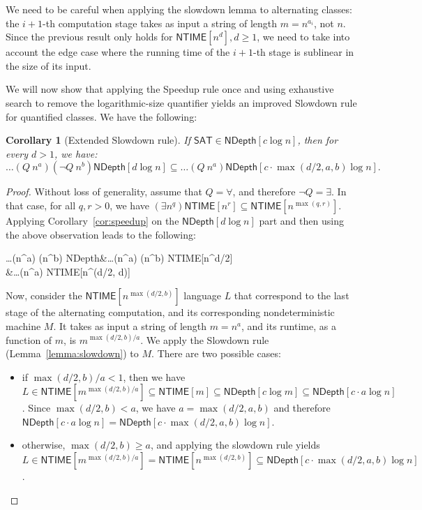 \documentclass[a4paper, 11pt]{article}
\theoremstyle{plain}
\newtheorem{corollary}[theorem]{Corollary}
\theoremstyle{definition}
\theoremstyle{remark}
\newcommand{\NTIME}{\textsf{NTIME}}%
\newcommand{\SAT}{\textsf{SAT}}%
\newcommand{\ND}{\textsf{NDepth}}%
\newcommand{\NDL}[1]{\ND\left[ #1 \log n\right]}%
\begin{document}
We need to be careful when applying the slowdown lemma to alternating classes:
the $i+1$-th computation stage takes as input a string of length $m = n^{a_i}$, not $n$.
Since the previous result only holds for $\NTIME[n^d], d \ge 1$, 
we need to take into account the edge case where the running time of
the $i+1$-th stage is sublinear in the size of its input.

We will now show that applying the Speedup rule once and
using exhaustive search to remove the logarithmic-size quantifier
yields an improved Slowdown rule for quantified classes.
We have the following:
\begin{corollary}[Extended Slowdown rule]\label{cor:extended_slowdown}
	If $\SAT{}\in \NDL{c}$, then for every $d > 1$, we have:
	\[\ldots (Q~n^{a}) (\neg Q~n^b) \NDL{d}
	\subseteq \ldots (Q~n^{a}) \NDL{c\cdot\max(d/2, a, b)}.\]
\end{corollary}
\begin{proof}
	Without loss of generality, assume that $Q = \forall$, and therefore $\neg Q = \exists$.
	In that case, for all $q, r > 0$, we have $(\exists n^q) \NTIME[n^r] \subseteq \NTIME[n^{\max(q,r)}] $.
	Applying Corollary~\ref{cor:speedup} on the $\NDL{d}$ part and then using the 
	above observation leads to the following:
	\begin{flalign*}
	\ldots (\forall n^{a}) (\exists n^b) \NDL{d} 
		&\subseteq \ldots (\forall n^{a}) (\exists n^b) \NTIME[n^{d/2}]\\	
		&\subseteq \ldots (\forall n^{a}) \NTIME[n^{\max(d/2, d)}]	
	\end{flalign*}

	Now, consider the $\NTIME[n^{\max(d/2, b)}]$ language $L$
	that correspond to the last stage of the alternating 
	computation, and its corresponding nondeterministic machine $M$. 
	It takes as input a string of length $m = n^{a}$, and its runtime, as a function of $m$, 
	is $m^{\max(d/2, b)/a}$.
	We apply the Slowdown rule (Lemma~\ref{lemma:slowdown}) to $M$. There are two possible cases:
	\begin{itemize}
		\item if $\max(d/2, b)/a < 1$, then we have 
		$L \in \NTIME[m^{\max(d/2, b)/a}] \subseteq \NTIME[m]
		\subseteq \ND[c \log m] \subseteq \NDL{c \cdot a}$.
		Since  $\max(d/2, b) < a$, we have $a = \max(d/2, a, b)$ and therefore 
		$\NDL{c \cdot a} = \NDL{c\cdot\max(d/2, a, b)}$.
		\item otherwise, $\max(d/2, b) \ge a$, and applying the slowdown rule yields
		$L \in \NTIME[m^{\max(d/2, b)/a}] =  \NTIME[n^{\max(d/2, b)}] \subseteq \NDL{c \cdot \max(d/2, a, b)}$.
	\end{itemize}
\end{proof}
\end{document}
